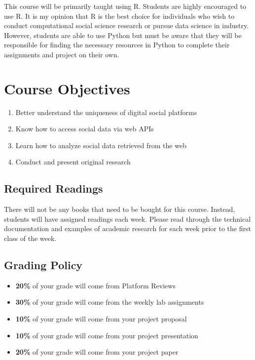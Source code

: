 \documentclass[11pt,]{article}
\begin{document}
This course will be primarily taught using R. Students are highly
encouraged to use R. It is my opinion that R is the best choice for
individuals who wish to conduct computational social science research or
pursue data science in industry. However, students are able to use
Python but must be aware that they will be responsible for finding the
necessary resources in Python to complete their assignments and project
on their own.

\hypertarget{course-objectives}{%
\section{Course Objectives}\label{course-objectives}}

\begin{enumerate}
\def\labelenumi{\arabic{enumi}.}
\item
  Better understand the uniqueness of digital social platforms
\item
  Know how to access social data via web APIs
\item
  Learn how to analyze social data retrieved from the web
\item
  Conduct and present original research
\end{enumerate}

\hypertarget{required-readings}{%
\subsection{Required Readings}\label{required-readings}}

There will not be any books that need to be bought for this course.
Instead, students will have assigned readings each week. Please read
through the technical documentation and examples of academic research
for each week prior to the first class of the week.

\hypertarget{grading-policy}{%
\subsection{Grading Policy}\label{grading-policy}}

\begin{itemize}
\item
  \textbf{20\%} of your grade will come from Platform Reviews
\item
  \textbf{30\%} of your grade will come from the weekly lab assignments
\item
  \textbf{10\%} of your grade will come from your project proposal
\item
  \textbf{10\%} of your grade will come from your project presentation
\item
  \textbf{20\%} of your grade will come from your project paper
\end{itemize}
\end{document}

